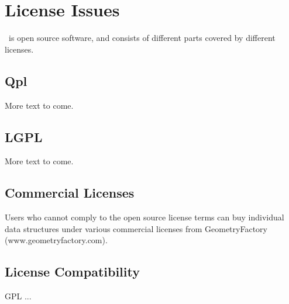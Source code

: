 
\section{License Issues}

\cgal\ is open source software, and consists of different parts covered by different licenses.

\subsection{Qpl \label{licenses:QPL}}

More text to come.

\subsection{LGPL \label{licenses:LGPL}}

More text to come.

\subsection{Commercial Licenses \label{licenses:Commercial}}

Users who cannot comply to the open source license terms can buy individual
data structures under various commercial licenses from GeometryFactory (www.geometryfactory.com).

\subsection{License Compatibility \label{licenses:Compatibility}}

GPL ...
